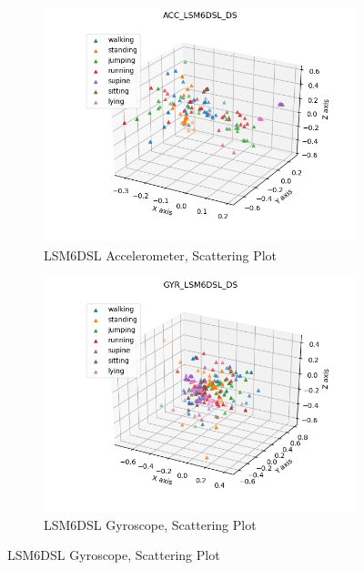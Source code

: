 \begin{center}
	\begin{figure}[H]
		\begin{subfigure}[H]{0.45\textwidth}
			\includegraphics[scale=0.6]{figures/scatter3d_ACC_LSM6DSL_DS.png}
			\caption{LSM6DSL Accelerometer, Scattering Plot}\label{fig:13a}
		\end{subfigure}
		\begin{subfigure}[H]{0.45\textwidth}
			\includegraphics[scale=0.6]{figures/scatter3d_GYR_LSM6DSL_DS.png}
			\caption{LSM6DSL Gyroscope, Scattering Plot}\label{fig:14b}
		\end{subfigure}
	\end{figure} 
\end{center}

